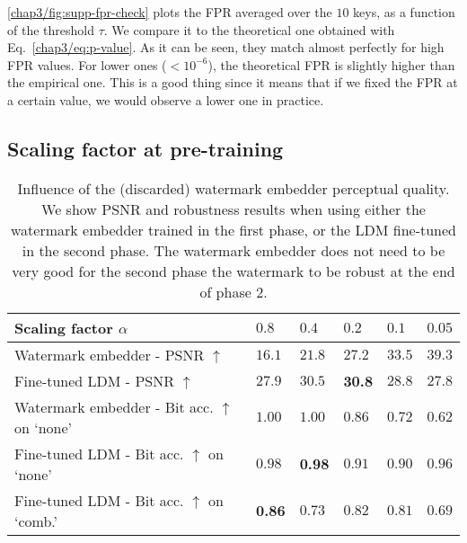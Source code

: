 \autoref{chap3/fig:supp-fpr-check} plots the FPR averaged over the $10$ keys, as a function of the threshold $\tau$.
We compare it to the theoretical one obtained with Eq.~\eqref{chap3/eq:p-value}.
As it can be seen, they match almost perfectly for high FPR values. 
For lower ones ($<10^{-6}$), the theoretical FPR is slightly higher than the empirical one.
This is a good thing since it means that if we fixed the FPR at a certain value, we would observe a lower one in practice.












\subsection{Scaling factor at pre-training} 


\begin{table}[t!]
    \centering
    \caption{
        Influence of the (discarded) watermark embedder perceptual quality. 
        We show PSNR and robustness results when using either the watermark embedder trained in the first phase, or the LDM fine-tuned in the second phase.
        The watermark embedder does not need to be very good for the second phase the watermark to be robust at the end of phase 2.
    }\label{chap3/tab:encoder-quality}
    \footnotesize
    \begin{tabular}{l *{5}{l}}
        \toprule
        Scaling factor $\alpha$ & $0.8$ & $0.4$ & $0.2$ & $0.1$ & $0.05$ \\ 
        \midrule
        Watermark embedder - PSNR $\uparrow$  & $16.1$ & $21.8$ & $27.2$ & $33.5$ & $39.3$ \\
        Fine-tuned LDM - PSNR $\uparrow$  & $27.9$ & $30.5$ & \textbf{30.8} & $28.8$ & $27.8$ \\
        \midrule
        Watermark embedder - Bit acc. $\uparrow$ on `none'& $1.00$ & $1.00$ & $0.86$ & $0.72$ & $0.62$ \\
        Fine-tuned LDM - Bit acc. $\uparrow$ on `none'& $0.98$ & \textbf{0.98} & $0.91$ & $0.90$ & $0.96$ \\
        Fine-tuned LDM - Bit acc.  $\uparrow$ on `comb.'& \textbf{0.86} & $0.73$ & $0.82$ & $0.81$ & $0.69$ \\
        \bottomrule 
    \end{tabular}
\end{table}


